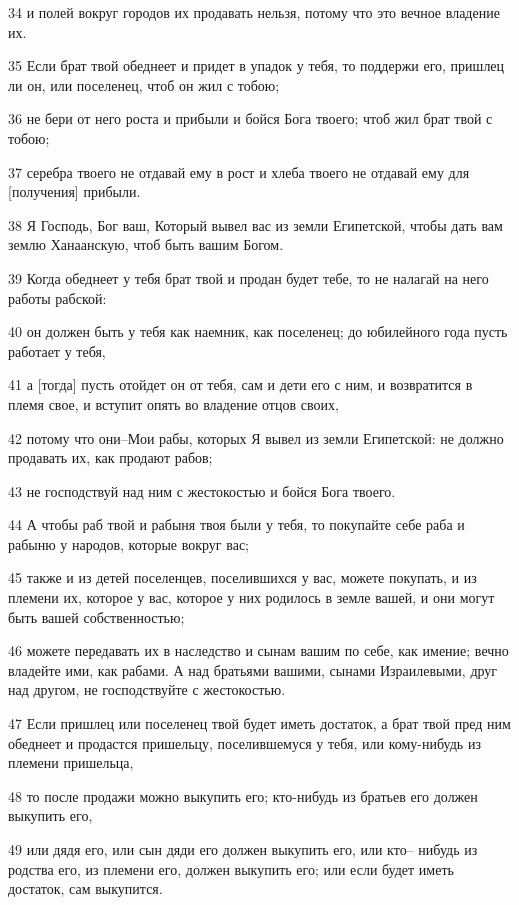 \par 34 и полей вокруг городов их продавать нельзя, потому что это вечное владение их.
\par 35 Если брат твой обеднеет и придет в упадок у тебя, то поддержи его, пришлец ли он, или поселенец, чтоб он жил с тобою;
\par 36 не бери от него роста и прибыли и бойся Бога твоего; чтоб жил брат твой с тобою;
\par 37 серебра твоего не отдавай ему в рост и хлеба твоего не отдавай ему для [получения] прибыли.
\par 38 Я Господь, Бог ваш, Который вывел вас из земли Египетской, чтобы дать вам землю Ханаанскую, чтоб быть вашим Богом.
\par 39 Когда обеднеет у тебя брат твой и продан будет тебе, то не налагай на него работы рабской:
\par 40 он должен быть у тебя как наемник, как поселенец; до юбилейного года пусть работает у тебя,
\par 41 а [тогда] пусть отойдет он от тебя, сам и дети его с ним, и возвратится в племя свое, и вступит опять во владение отцов своих,
\par 42 потому что они--Мои рабы, которых Я вывел из земли Египетской: не должно продавать их, как продают рабов;
\par 43 не господствуй над ним с жестокостью и бойся Бога твоего.
\par 44 А чтобы раб твой и рабыня твоя были у тебя, то покупайте себе раба и рабыню у народов, которые вокруг вас;
\par 45 также и из детей поселенцев, поселившихся у вас, можете покупать, и из племени их, которое у вас, которое у них родилось в земле вашей, и они могут быть вашей собственностью;
\par 46 можете передавать их в наследство и сынам вашим по себе, как имение; вечно владейте ими, как рабами. А над братьями вашими, сынами Израилевыми, друг над другом, не господствуйте с жестокостью.
\par 47 Если пришлец или поселенец твой будет иметь достаток, а брат твой пред ним обеднеет и продастся пришельцу, поселившемуся у тебя, или кому-нибудь из племени пришельца,
\par 48 то после продажи можно выкупить его; кто-нибудь из братьев его должен выкупить его,
\par 49 или дядя его, или сын дяди его должен выкупить его, или кто-- нибудь из родства его, из племени его, должен выкупить его; или если будет иметь достаток, сам выкупится.
